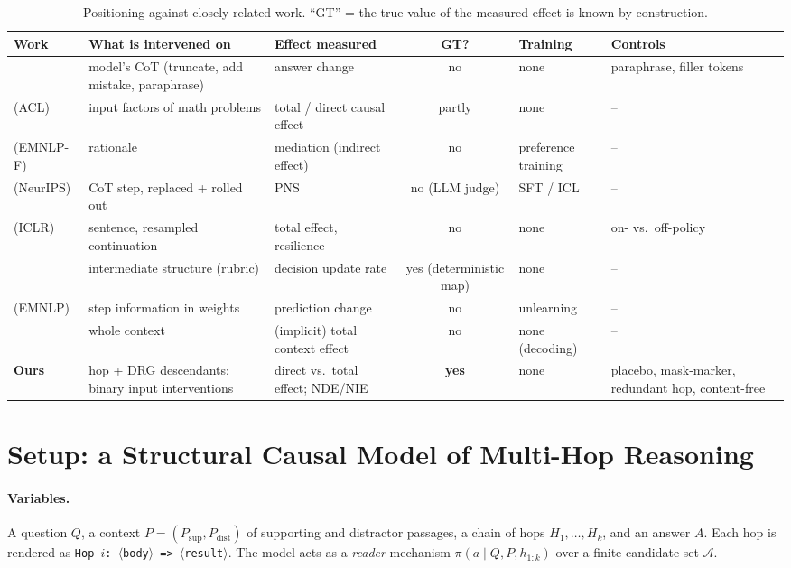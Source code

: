 \documentclass[11pt]{article}
\newcommand{\pa}{\pi}
\begin{document}
\begin{table}[t]
\centering\scriptsize
\caption{Positioning against closely related work. ``GT'' = the true value of the measured effect
is known by construction.}
\label{tab:positioning}
\begin{tabular}{p{2.3cm}p{2.2cm}p{2.6cm}cp{1.9cm}p{2.1cm}}
\toprule
Work & What is intervened on & Effect measured & GT? & Training & Controls \\
\midrule
\citet{lanham2023faithfulness} & model's CoT (truncate, add mistake, paraphrase) & answer change & no & none & paraphrase, filler tokens \\
\citet{stolfo2023causal} (ACL) & input factors of math problems & total / direct causal effect & partly & none & -- \\
\citet{paul2024frodo} (EMNLP-F) & rationale & mediation (indirect effect) & no & preference training & -- \\
\citet{yu2025pns} (NeurIPS) & CoT step, replaced + rolled out & PNS & no (LLM judge) & SFT / ICL & -- \\
\citet{macar2026branches} (ICLR) & sentence, resampled continuation & total effect, resilience & no & none & on- vs.\ off-policy \\
\citet{somov2026breaking} & intermediate structure (rubric) & decision update rate & yes (deterministic map) & none & -- \\
\citet{tutek2025fur} (EMNLP) & step information in weights & prediction change & no & unlearning & -- \\
\citet{shi2024cad,wang2025adacad} & whole context & (implicit) total context effect & no & none (decoding) & -- \\
\textbf{Ours} & hop + DRG descendants; binary input interventions & direct vs.\ total effect; NDE/NIE & \textbf{yes} & none & placebo, mask-marker, redundant hop, content-free \\
\bottomrule
\end{tabular}
\end{table}

\section{Setup: a Structural Causal Model of Multi-Hop Reasoning}
\label{sec:setup}

\paragraph{Variables.} A question $Q$, a context $P=(P_{\mathrm{sup}},P_{\mathrm{dist}})$ of
supporting and distractor passages, a chain of hops $H_1,\dots,H_k$, and an answer $A$. Each hop
is rendered as \texttt{Hop $i$: $\langle$body$\rangle$ => $\langle$result$\rangle$}. The model acts
as a \emph{reader} mechanism $\pa(a\mid Q,P,h_{1:k})$ over a finite candidate set $\mathcal{A}$.
\end{document}
